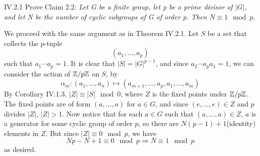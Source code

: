 \begin{problem}{IV.2.1}
Prove Claim 2.2: 
\textit{Let G be a finite group, let p be a prime divisor of $|G|$, and let N be the number of cyclic subgroups of G of order p. Then $N \equiv 1 \mod p$.}
\end{problem}
\begin{pf}
We proceed with the same argument as in Theorem IV.2.1. Let $S$ be a set that collects the $p$-tuple
\[
(a_1,\dotsc,a_p)	
\]
such that $a_1\cdots a_p = 1$. It is clear that $|S| = |G|^{p-1}$, and since $a_2\cdots a_p a_1 = 1$, we can consider the action of $\mathbb{Z}/p\mathbb{Z}$ on $S$, by 
\[
\alpha_m : (a_1,\dotsc,a_n) \mapsto (a_{m+1},\dotsc,a_p,a_1,\dotsc,a_m)	
\]
By Corollary IV.1.3, $|Z| \equiv |S| \mod 0$, where $Z$ is the fixed points under $\mathbb{Z}/p\mathbb{Z}$. The fixed points are of form $(a,\dotsc,a)$ for $a \in G$, and since $(e,\dotsc,e) \in Z$ and $p$ divides $|Z|$, $|Z| > 1$. Now notice that for each $a \in G$ such that $(a,\dotsc,a) \in Z$, $a$ is a generator for some cyclic group of order $p$, so there are $N(p-1) + 1$(identity) elements in $Z$. But since $|Z| \equiv 0 \mod p$, we have
\[
Np - N + 1 \equiv 0 \mod p  \Longrightarrow N \equiv 1 \mod p
\]
as desired.
\end{pf}

